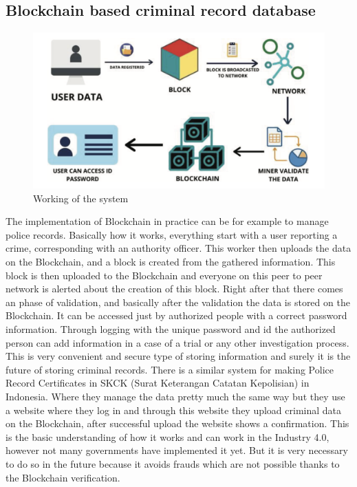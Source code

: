 \documentclass[10pt,english,a4paper]{article}
\begin{document}
\subsection{Blockchain based criminal record database}
\begin{figure}
    \centering
    \includegraphics[scale=0.2]{Implemantation of criminal records database.png}
    \caption{Working of the system\cite{Jain:Criminal:record}}
    \label{histogram}
\end{figure}
The implementation of Blockchain in practice can be for example to manage police records. Basically how it works, everything start with a user reporting a crime, corresponding with an authority officer. This worker then uploads the data on the Blockchain, and a block is created from the gathered information. This block is then uploaded to the Blockchain and everyone on this peer to peer network is alerted about the creation of this block. Right after that there comes an phase of validation, and basically after the validation the data is stored on the Blockchain. It can be accessed just by authorized people with a correct password information. Through logging with the unique password and id the authorized person can add information in a case of a trial or any  other investigation process. This is very convenient and secure type of storing information and surely it is the future of storing criminal records.
\cite{Jain:Criminal:record}
There is a similar system for making Police Record Certificates in SKCK (Surat Keterangan Catatan Kepolisian) in Indonesia. Where they manage the data pretty much the same way but they use a website where they log in and through this website they upload criminal data on the Blockchain, after successful upload the website shows a confirmation. This is the basic understanding of how it works and can work in the Industry 4.0, however not many governments have implemented it yet. But it is very necessary to  do so in the future because it avoids frauds which are not possible thanks to the Blockchain verification.
\cite{Suroso:SKCK}
\end{document}
